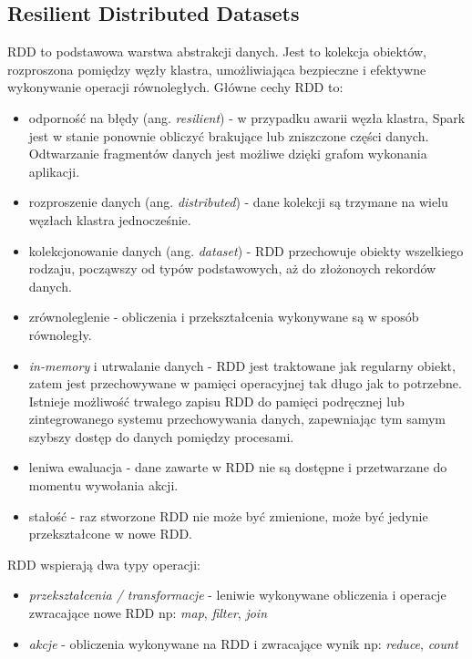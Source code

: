 \documentclass[licencjacka]{pracamgr}
\begin{document}
\subsection{Resilient Distributed Datasets}
RDD to podstawowa warstwa abstrakcji danych. Jest to kolekcja obiektów, rozproszona pomiędzy węzły klastra, umożliwiająca bezpieczne i efektywne wykonywanie operacji równoległych. Główne cechy RDD to:
\begin{itemize}
    \item odporność na błędy (ang. \textit{resilient}) - w przypadku awarii węzła klastra, Spark jest w stanie ponownie obliczyć brakujące lub zniszczone części danych. Odtwarzanie fragmentów danych jest możliwe dzięki grafom wykonania aplikacji.
    \item rozproszenie danych (ang. \textit{distributed}) - dane kolekcji są trzymane na wielu węzłach klastra jednocześnie.
    \item kolekcjonowanie danych (ang. \textit{dataset}) - RDD przechowuje obiekty wszelkiego rodzaju, począwszy od typów podstawowych, aż do złożonoych rekordów danych.
    \item zrównoleglenie - obliczenia i przekształcenia wykonywane są w sposób równoległy.
    \item \textit{in-memory} i utrwalanie danych - RDD jest traktowane jak regularny obiekt, zatem jest przechowywane w pamięci operacyjnej tak długo jak to potrzebne. Istnieje możliwość trwałego zapisu RDD do pamięci podręcznej lub zintegrowanego systemu przechowywania danych, zapewniając tym samym szybszy dostęp do danych pomiędzy procesami.
    \item leniwa ewaluacja - dane zawarte w RDD nie są dostępne i przetwarzane do momentu wywołania akcji.
    \item stałość - raz stworzone RDD nie może być zmienione, może być jedynie przekształcone w nowe RDD.
    
\end{itemize}

RDD wspierają dwa typy operacji:
\begin{itemize}
    \item \textit{przekształcenia / transformacje} - leniwie wykonywane obliczenia i operacje zwracające nowe RDD np: \textit{map}, \textit{filter}, \textit{join}
    \item \textit{akcje} - obliczenia wykonywane na RDD i zwracające wynik np: \textit{reduce}, \textit{count}
\end{itemize}
\end{document}
